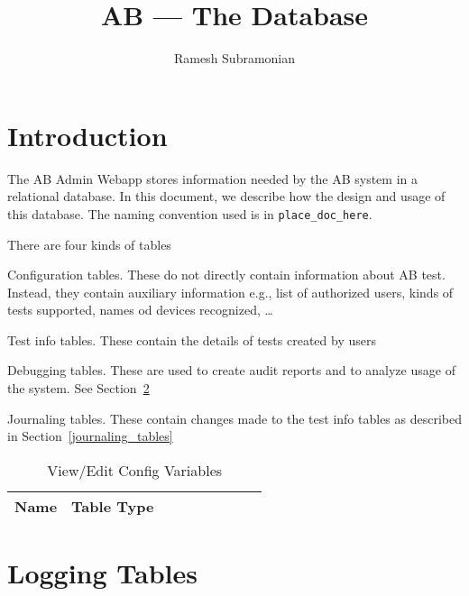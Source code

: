 \documentclass[letterpaper]{article}
\begin{document}
\title{AB --- The Database}
\author{ Ramesh Subramonian }
\maketitle
\thispagestyle{fancy}
\lhead{}
\chead{}
\rhead{}
\cfoot{}
\rfoot{{\small \thepage}}
\section{Introduction}

The AB Admin Webapp stores information needed by the AB system in a relational
database. In this document, we describe how the design and usage of this
database. 
The naming convention used is in \verb+place_doc_here+.

There are four kinds of tables 
\be
\item Configuration tables. These do not directly contain information about AB test.
Instead, they contain auxiliary information e.g., list of authorized users,
kinds of tests supported, names od devices recognized, \ldots
\item Test info tables. These contain the details of tests created by users
\item Debugging tables. These are used to create audit reports and to
  analyze usage of the system. See Section~\ref{logging_tables}
\item Journaling tables. These contain changes made to the test info tables as
described in Section~\ref{journaling_tables}
\ee


\begin{table}[hb]
\centering
\begin{tabular}{|l||l|l|l|l|l|l|l|l|}  \hline \hline
  {\bf Name } & {\bf Table Type} \\ \hline \hline

\hline
\end{tabular}
\caption{View/Edit Config Variables}
\label{tbl_config}
\end{table}

\section{Logging Tables}
\label{logging_tables}
\end{document}
